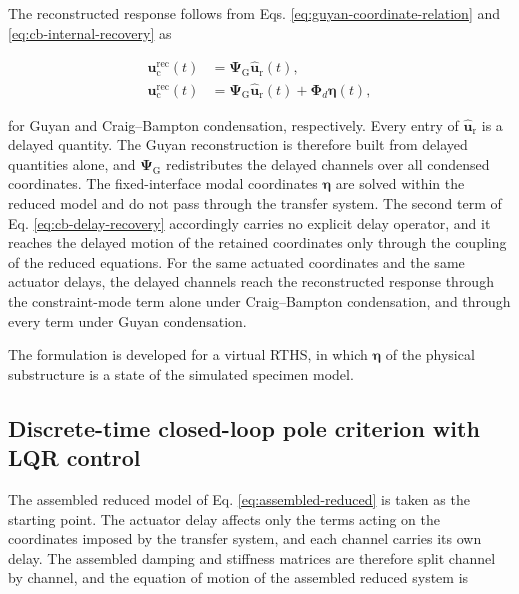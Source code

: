 \documentclass[a4paper,fleqn,review,12pt]{cas-sc}
\numberwithin{equation}{section}
\begin{document}
The reconstructed response follows from Eqs. \eqref{eq:guyan-coordinate-relation} and \eqref{eq:cb-internal-recovery} as

\vspace{-3.5em}
\begin{subequations}
	\label{eq:delay-recovery}
	\begin{align}
		\bm{u}_{\mathrm{c}}^{\mathrm{rec}}(t)&=\bm{\Psi}_{\mathrm{G}}\hat{\bm{u}}_{\mathrm{r}}(t),
		\label{eq:guyan-delay-recovery}\\
		\bm{u}_{\mathrm{c}}^{\mathrm{rec}}(t)&=\bm{\Psi}_{\mathrm{G}}\hat{\bm{u}}_{\mathrm{r}}(t)
		+\bm{\Phi}_{d}\bm{\eta}(t),
		\label{eq:cb-delay-recovery}
	\end{align}
\end{subequations}
\vspace{-3.5em}

for Guyan and Craig--Bampton condensation, respectively. Every entry of \(\hat{\bm{u}}_{\mathrm{r}}\) is a delayed quantity. The Guyan reconstruction is therefore built from delayed quantities alone, and \(\bm{\Psi}_{\mathrm{G}}\) redistributes the delayed channels over all condensed coordinates. The fixed-interface modal coordinates \(\bm{\eta}\) are solved within the reduced model and do not pass through the transfer system. The second term of Eq. \eqref{eq:cb-delay-recovery} accordingly carries no explicit delay operator, and it reaches the delayed motion of the retained coordinates only through the coupling of the reduced equations. For the same actuated coordinates and the same actuator delays, the delayed channels reach the reconstructed response through the constraint-mode term alone under Craig--Bampton condensation, and through every term under Guyan condensation.

The formulation is developed for a virtual RTHS, in which \(\bm{\eta}\) of the physical substructure is a state of the simulated specimen model.

\subsection{Discrete-time closed-loop pole criterion with LQR control}
\label{sec:pole-criterion}

The assembled reduced model of Eq. \eqref{eq:assembled-reduced} is taken as the starting point. The actuator delay affects only the terms acting on the coordinates imposed by the transfer system, and each channel carries its own delay. The assembled damping and stiffness matrices are therefore split channel by channel, and the equation of motion of the assembled reduced system is
\end{document}
